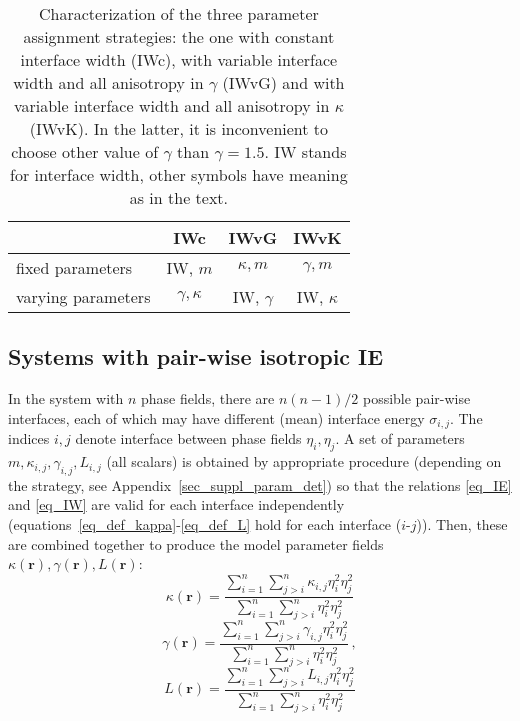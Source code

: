 \begin{table}[h]
	\centering
	\caption{Characterization of the three parameter assignment strategies: the one with constant interface width (IWc), with variable interface width and all anisotropy in $\gamma$ (IWvG) and with variable interface width and all anisotropy in $\kappa$ (IWvK). In the latter, it is inconvenient to choose other value of $\gamma$ than $\gamma=1.5$. IW stands for interface width, other symbols have meaning as in the text.}
	\label{tab_models_comparison}
	\begin{tabular}{l|c|c|c|}\footnotesize
		& IWc & IWvG & IWvK \\ \hline
		fixed parameters & IW, $m$ & $\kappa, m$ & $\gamma, m$  \\
		varying parameters & $\gamma, \kappa$ & IW, $\gamma$ & IW, $\kappa$
	\end{tabular}
\end{table}

\subsection{Systems with pair-wise isotropic IE}
In the system with $n$ phase fields, there are $n(n-1)/2$ possible pair-wise interfaces, each of which may have different (mean) interface energy $\sigma_{i,j}$. The indices $i,j$ denote interface between phase fields $\eta_i,\eta_j$. A set of parameters $m,\kappa_{i,j},\gamma_{i,j}, L_{i,j}$ (all scalars) is obtained by appropriate procedure  (depending on the strategy, see Appendix~\ref{sec_suppl_param_det}) so that the relations \eqref{eq_IE} and \eqref{eq_IW} are valid for each interface independently (equations~\eqref{eq_def_kappa}-\eqref{eq_def_L} hold for each interface ($i$-$j$)). Then, these are combined together to produce the model parameter fields $\kappa(\bm{r}),\gamma(\bm{r}),L(\bm{r})$:
\begin{equation}
	\kappa(\bm{r}) = \frac{\sum_{i=1}^n\sum_{j>i}^n\kappa_{i,j}\eta_i^2\eta_j^2}{\sum_{i=1}^n\sum_{j>i}^n\eta_i^2\eta_j^2}
\end{equation}
\begin{equation}
	\gamma(\bm{r}) = \frac{\sum_{i=1}^n\sum_{j>i}^n\gamma_{i,j}\eta_i^2\eta_j^2}{\sum_{i=1}^n\sum_{j>i}^n\eta_i^2\eta_j^2} \,,
\end{equation}
\begin{equation}
	L(\bm{r})= \frac{\sum_{i=1}^n\sum_{j>i}^nL_{i,j}\eta_i^2\eta_j^2}{\sum_{i=1}^n\sum_{j>i}^n\eta_i^2\eta_j^2}
\end{equation}

